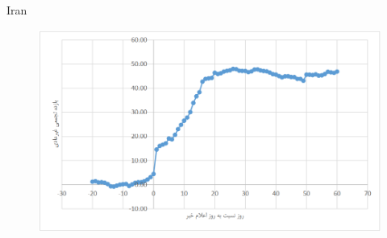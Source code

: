 \documentclass{beamer}
\begin{document}
%		
%	
\normalsize
\begin{frame}{Iran}
\begin{figure}
\centering
\includegraphics[width=0.65\linewidth]{Soltani}
\label{Soltani}
\end{figure}
\end{frame}
\end{document}
